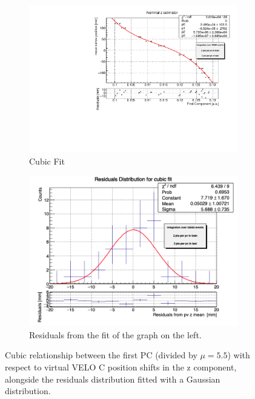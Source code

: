 \begin{samepage}
\begin{figure}
    \label{fig:y_veloC_MC}
\end{figure}
\begin{figure}
    \centering
    \begin{subfigure}{0.48\textwidth}
    \includegraphics[width=\linewidth]{figures/z_fit_veloC_MC_residuals.pdf}
    \caption{Cubic Fit}\label{fig:z_veloC_fit_MC}
    \end{subfigure}
    \begin{subfigure}{0.48\textwidth}
    \includegraphics[width=\linewidth]{figures/z_res_veloC_MC.png}
    \caption{Residuals from the fit of the graph on the left. }\label{fig:z_veloC_res_MC}
    \end{subfigure}
    \caption{Cubic relationship between the first PC (divided by $\mu=5.5$) with respect to virtual VELO C position shifts in the z component, alongside the residuals distribution fitted with a Gaussian distribution.}
    \label{fig:z_veloC_MC}
\end{figure}
\end{samepage}


